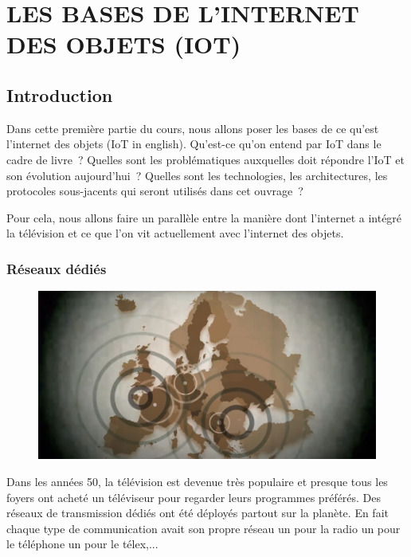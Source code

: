 
\chapter{LES BASES DE L'INTERNET DES OBJETS (IOT)}

\section{Introduction}

  \vspace{1em}
 \begin{figure}
\end{figure}
 Dans cette première partie du cours, nous allons poser les bases de ce qu'est l'internet des objets (\ac{IoT} in english). Qu'est-ce qu'on entend par \ac{IoT} dans le cadre de livre~? Quelles sont les problématiques auxquelles doit répondre l'\ac{IoT} et son évolution aujourd'hui~? Quelles sont les technologies, les architectures, les protocoles sous-jacents qui seront utilisés dans cet ouvrage~? 
 
 Pour cela, nous allons faire un parallèle entre la manière dont l'internet a intégré la télévision et ce que l'on vit actuellement avec l'internet des objets. 
 
 \subsection{Réseaux dédiés}
   \vspace{1em}

\begin{figure}
\centerline{\includegraphics[width=.4\columnwidth]{Pictures/illu-propa.png}}
\end{figure}

 Dans les années 50, la télévision est devenue très populaire et presque tous les foyers ont acheté un téléviseur pour regarder leurs programmes préférés. Des réseaux de transmission dédiés ont été déployés partout sur la planète. En fait chaque type de communication avait son propre réseau un pour la radio un pour le téléphone un pour le télex,...
 


